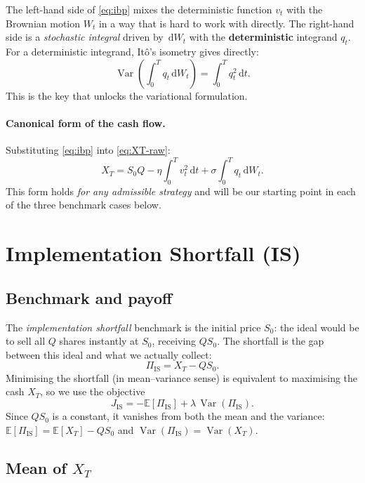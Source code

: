 \documentclass[12pt, a4paper]{article}
\newcommand{\E}{\mathbb{E}}
\newcommand{\Var}{\operatorname{Var}}
\newcommand{\dd}{\,\mathrm{d}}
\begin{document}
\begin{keybox}
  The left-hand side of \eqref{eq:ibp} mixes the deterministic function $v_t$
  with the Brownian motion $W_t$ in a way that is hard to work with directly.
  The right-hand side is a \emph{stochastic integral} driven by $\dd W_t$
  with the \textbf{deterministic} integrand $q_t$.
  For a deterministic integrand, It\^{o}'s isometry gives directly:
  \[
    \Var\!\left(\int_0^T q_t \dd W_t\right) = \int_0^T q_t^2 \dd t.
  \]
  This is the key that unlocks the variational formulation.
\end{keybox}

\paragraph{Canonical form of the cash flow.}
Substituting \eqref{eq:ibp} into \eqref{eq:XT-raw}:
\begin{equation}
  X_T = S_0 Q - \eta\!\int_0^T v_t^2 \dd t + \sigma\!\int_0^T q_t \dd W_t.
  \label{eq:XT-canonical}
\end{equation}
This form holds \emph{for any admissible strategy} and will be our starting point
in each of the three benchmark cases below.

\section{Implementation Shortfall (IS)}
\label{sec:IS}

\subsection{Benchmark and payoff}

The \emph{implementation shortfall} benchmark is the initial price $S_0$:
the ideal would be to sell all $Q$ shares instantly at $S_0$, receiving $QS_0$.
The shortfall is the gap between this ideal and what we actually collect:
\[
  \Pi_{\mathrm{IS}} = X_T - QS_0.
\]
Minimising the shortfall (in mean--variance sense) is equivalent to maximising the
cash $X_T$, so we use the objective
\[
  J_{\mathrm{IS}} = -\E[\Pi_{\mathrm{IS}}] + \lambda\,\Var(\Pi_{\mathrm{IS}}).
\]
Since $QS_0$ is a constant, it vanishes from both the mean and the variance:
$\E[\Pi_{\mathrm{IS}}] = \E[X_T] - QS_0$ and $\Var(\Pi_{\mathrm{IS}}) = \Var(X_T)$.

\subsection{Mean of \texorpdfstring{$X_T$}{XT}}
\end{document}
